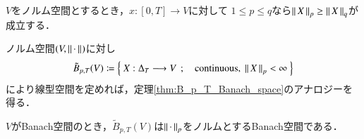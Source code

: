 	\begin{screen}
		\begin{thm}
		\label{thm:p_variation_monotonously_decreasing_2}
			$V$をノルム空間とするとき，$x:[0,T] \longrightarrow V$に対して
			$1 \leq p \leq q$なら$\left\|\, X\, \right\|_{p} \geq \left\|\, X\, \right\|_{q}$が成立する．
		\end{thm}
	\end{screen}
	
	ノルム空間$(V,\left\|\, \cdot\, \right\|_{})$に対し
	\begin{align}
		\tilde{B}_{p,T}(V)
		\coloneqq \Set{X:\Delta_T \longrightarrow V}{\mbox{continuous},\ \Norm{X}{p} < \infty}
	\end{align}
	により線型空間を定めれば，定理\ref{thm:B_p_T_Banach_space}のアナロジーを得る．
	
	\begin{screen}
		\begin{thm}\label{thm:B_p_T_Banach_space_2}
			$V$がBanach空間のとき，$\tilde{B}_{p,T}(V)$は$\left\|\, \cdot\, \right\|_{p}$をノルムとするBanach空間である．
		\end{thm}
	\end{screen}

